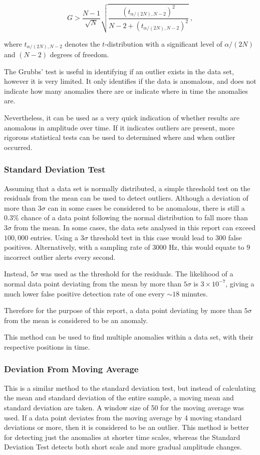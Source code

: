 \begin{equation}
    G > \dfrac{N-1}{\sqrt{N}} \sqrt{\dfrac{(t_{\alpha/(2N), N-2})^2}{N-2+(t_{\alpha/(2N), N-2})^2}} ~,
    \label{grubbs_condition}
\end{equation}

where $t_{\alpha/(2N), N-2}$ denotes the $t$-distribution with a significant level of $\alpha/(2N)$ and $(N-2)$ degrees of freedom. 

The Grubbs' test is useful in identifying if an outlier exists in the data set, however it is very limited. It only identifies if the data is anomalous, and does not indicate how many anomalies there are or indicate where in time the anomalies are.

Nevertheless, it can be used as a very quick indication of whether results are anomalous in amplitude over time. If it indicates outliers are present, more rigorous statistical tests can be used to determined where and when outlier occurred. 

\subsubsection{Standard Deviation Test}
Assuming that a data set is normally distributed, a simple threshold test on the residuals from the mean can be used to detect outliers. 
Although a deviation of more than $3\sigma$ can in some cases be considered to be anomalous, there is still a $0.3\%$ chance of a data point following the normal distribution to fall more than $3\sigma$ from the mean. In some cases, the data sets analysed in this report can exceed $100,000$ entries. Using a $3\sigma$ threshold test in this case would lead to $300$ false positives. Alternatively, with a sampling rate of $3000$ Hz, this would equate to $9$ incorrect outlier alerts every second. 

Instead, $5\sigma$ was used as the threshold for the residuals. The likelihood of a normal data point deviating from the mean by more than $5\sigma$ is $3 \times 10^{-7}$, giving a much lower false positive detection rate of one every $\sim 18$ minutes. 

Therefore for the purpose of this report, a data point deviating by more than $5\sigma$ from the mean is considered to be an anomaly. 

This method can be used to find multiple anomalies within a data set, with their respective positions in time.

\subsubsection{Deviation From Moving Average}
This is a similar method to the standard deviation test, but instead of calculating the mean and standard deviation of the entire sample, a moving mean and standard deviation are taken. A window size of 50 for the moving average was used.
If a data point deviates from the moving average by 4 moving standard deviations or more, then it is considered to be an outlier. This method is better for detecting just the anomalies at shorter time scales, whereas the Standard Deviation Test detects both short scale and more gradual amplitude changes. 

